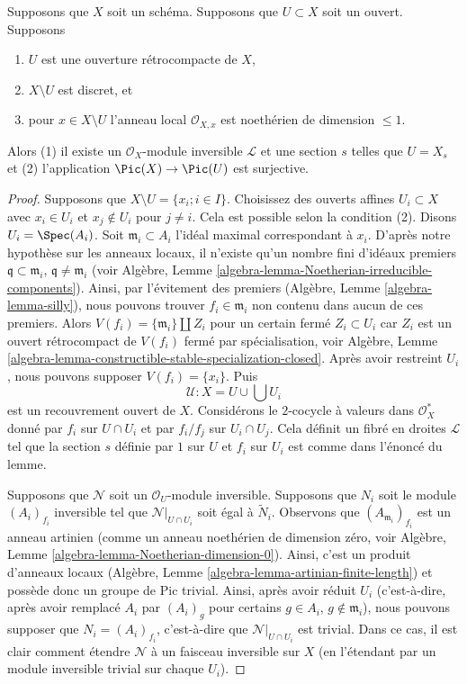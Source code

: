 \begin{lemma}
\label{lemma-complement-codim-1-closed-points}
Supposons que $X$ soit un schéma. Supposons que $U \subset X$ soit un ouvert. Supposons
\begin{enumerate}
\item $U$ est une ouverture rétrocompacte de
$X$, \item $X \setminus U$ est discret, et \item
pour $x \in X \setminus U$ l'anneau local
$\mathcal{O}_{X, x}$ est noethérien de dimension $\leq 1$.
\end{enumerate}
Alors (1) il existe un $\mathcal{O}_X$-module inversible
$\mathcal{L}$ et une section $s$ telles que $U = X_s$ et
(2) l'application $\Pic(X) \to \Pic(U)$ est surjective.
\end{lemma}

\begin{proof}
Supposons que $X \setminus U = \{x_i; i \in I\}$. Choisissez
des ouverts affines $U_i \subset X$ avec $x_i \in U_i$ et
$x_j \not \in U_i$ pour $j \not = i$. Cela est possible
selon la condition (2). Disons $U_i = \Spec(A_i)$. Soit
$\mathfrak m_i \subset A_i$ l'idéal maximal correspondant à
$x_i$. D'après notre hypothèse sur les anneaux locaux, il
n'existe qu'un nombre fini d'idéaux premiers $\mathfrak q
\subset \mathfrak m_i$, $\mathfrak q \not = \mathfrak m_i$
(voir Algèbre, Lemme
\ref{algebra-lemma-Noetherian-irreducible-components}). Ainsi, par
l'évitement des premiers (Algèbre, Lemme
\ref{algebra-lemma-silly}), nous pouvons trouver $f_i \in \mathfrak m_i$
non contenu dans aucun de ces premiers. Alors $V(f_i) = \{\mathfrak
m_i\} \amalg Z_i$ pour un certain fermé $Z_i \subset U_i$ car $Z_i$ est
un ouvert rétrocompact de $V(f_i)$ fermé par spécialisation, voir
Algèbre, Lemme
\ref{algebra-lemma-constructible-stable-specialization-closed}. Après avoir restreint $U_i$, nous pouvons supposer $V(f_i) = \{x_i\}$. Puis
$$
\mathcal{U} : X = U \cup \bigcup U_i
$$
est un recouvrement ouvert de $X$. Considérons le $2$-cocycle
à valeurs dans $\mathcal{O}_X^*$ donné par $f_i$ sur $U \cap
U_i$ et par $f_i/f_j$ sur $U_i \cap U_j$. Cela définit un fibré
en droites $\mathcal{L}$ tel que la section $s$ définie par
$1$ sur $U$ et $f_i$ sur $U_i$ est comme dans l'énoncé du lemme.

\medskip\noindent
Supposons que $\mathcal{N}$ soit un $\mathcal{O}_U$-module
inversible. Supposons que $N_i$ soit le module $(A_i)_{f_i}$
inversible tel que $\mathcal{N}|_{U \cap U_i}$ soit égal à
$\tilde N_i$. Observons que $(A_{\mathfrak m_i})_{f_i}$ est
un anneau artinien (comme un anneau noethérien de dimension
zéro, voir Algèbre, Lemme
\ref{algebra-lemma-Noetherian-dimension-0}). Ainsi, c'est un
produit d'anneaux locaux (Algèbre, Lemme
\ref{algebra-lemma-artinian-finite-length}) et possède donc un groupe
de Pic trivial. Ainsi, après avoir réduit $U_i$ (c'est-à-dire, après
avoir remplacé $A_i$ par $(A_i)_g$ pour certains $g \in A_i$, $g \not
\in \mathfrak m_i$), nous pouvons supposer que $N_i = (A_i)_{f_i}$,
c'est-à-dire que $\mathcal{N}|_{U \cap U_i}$ est trivial. Dans ce cas,
il est clair comment étendre $\mathcal{N}$ à un faisceau inversible sur
$X$ (en l'étendant par un module inversible trivial sur chaque $U_i$).
\end{proof}


